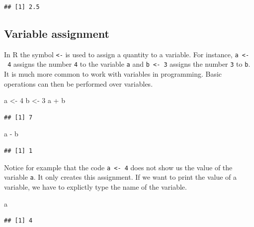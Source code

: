 \documentclass[
]{book}
\newenvironment{Shaded}{\begin{snugshade}}{\end{snugshade}}
\newcommand{\DecValTok}[1]{\textcolor[rgb]{0.00,0.00,0.81}{#1}}
\newcommand{\NormalTok}[1]{#1}
\newcommand{\OtherTok}[1]{\textcolor[rgb]{0.56,0.35,0.01}{#1}}
\newcommand{\SpecialCharTok}[1]{\textcolor[rgb]{0.00,0.00,0.00}{#1}}
\begin{document}
\begin{verbatim}
## [1] 2.5
\end{verbatim}

\hypertarget{variable-assignment}{%
\subsection{Variable assignment}\label{variable-assignment}}

In R the symbol \texttt{\textless{}-} is used to assign a quantity to a variable. For instance, \texttt{a\ \textless{}-\ 4} assigns the number \texttt{4} to the variable \texttt{a} and \texttt{b\ \textless{}-\ 3} assigns the number \texttt{3} to \texttt{b}. It is much more common to work with variables in programming. Basic operations can then be performed over variables.

\begin{Shaded}
\begin{Highlighting}[]
\NormalTok{a }\OtherTok{\textless{}{-}} \DecValTok{4}
\NormalTok{b }\OtherTok{\textless{}{-}} \DecValTok{3}
\NormalTok{a }\SpecialCharTok{+}\NormalTok{ b}
\end{Highlighting}
\end{Shaded}

\begin{verbatim}
## [1] 7
\end{verbatim}

\begin{Shaded}
\begin{Highlighting}[]
\NormalTok{a }\SpecialCharTok{{-}}\NormalTok{ b}
\end{Highlighting}
\end{Shaded}

\begin{verbatim}
## [1] 1
\end{verbatim}

Notice for example that the code \texttt{a\ \textless{}-\ 4} does not show us the value of the variable \texttt{a}. It only creates this assignment. If we want to print the value of a variable, we have to explictly type the name of the variable.

\begin{Shaded}
\begin{Highlighting}[]
\NormalTok{a}
\end{Highlighting}
\end{Shaded}

\begin{verbatim}
## [1] 4
\end{verbatim}
\end{document}
